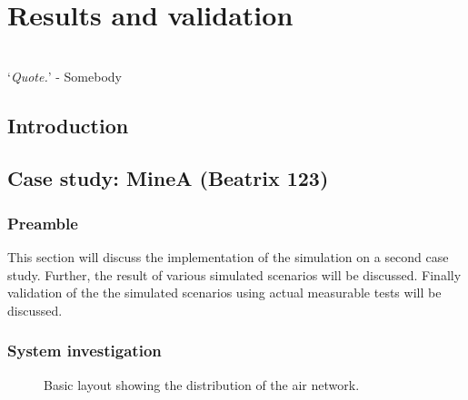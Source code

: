 \chapter{Results and validation}
\thispagestyle{empty}
\vspace{38em}
\hrulefill
\\
\enquote*{\textit{Quote.}} - Somebody\\
\newpage
\section{Introduction}

\section{Case study: MineA \color{blue}(Beatrix 123)}
	\subsection{Preamble}
This section will discuss the implementation of the simulation on a second case study. Further, the result of various simulated scenarios will be discussed. Finally validation of the the simulated scenarios using actual measurable tests will be discussed.
\subsection{System investigation}
\begin{figure}[h!]
	\centering
	\caption{Basic layout showing the distribution of the air network.}
	\label{fig: Beatrix Air layout}
\end{figure}
